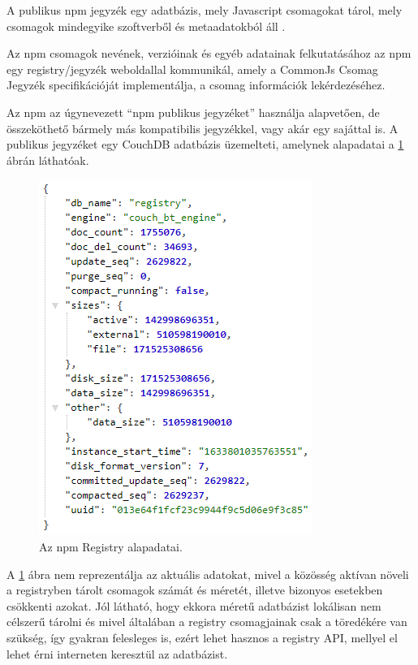
A publikus npm jegyzék egy adatbázis, mely Javascript csomagokat tárol, mely csomagok mindegyike szoftverből és metaadatokból áll \cite{npm-registry}.

Az npm csomagok nevének, verzióinak és egyéb adatainak felkutatásához az npm egy registry/jegyzék weboldallal kommunikál, amely a CommonJs Csomag Jegyzék specifikációját implementálja, a csomag információk lekérdezéséhez.
 
Az npm az úgynevezett “npm publikus jegyzéket” használja alapvetően, de összeköthető bármely más kompatibilis jegyzékkel, vagy akár egy sajáttal is. A publikus jegyzéket egy CouchDB adatbázis üzemelteti, amelynek alapadatai a \ref{fig:registry} ábrán láthatóak.\\

\begin{figure}[h]
	\centering
	\includegraphics[scale=0.75]{images/registry_data.png}
	\caption{Az npm Registry alapadatai.}
	\label{fig:registry}
\end{figure}

\pagebreak

A \ref{fig:registry} ábra nem reprezentálja az aktuális adatokat, mivel a közösség aktívan növeli a registryben tárolt csomagok számát és méretét, illetve bizonyos esetekben csökkenti azokat. Jól látható, hogy ekkora méretű adatbázist lokálisan nem célszerű tárolni és mivel általában a registry csomagjainak csak a töredékére van szükség, így gyakran felesleges is, ezért lehet hasznos a registry API, mellyel el lehet érni interneten keresztül az adatbázist.\\

